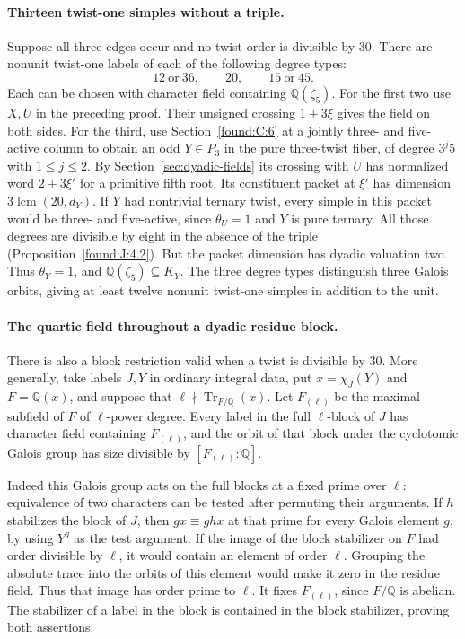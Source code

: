 \documentclass[11pt,a4paper]{article}
\numberwithin{equation}{section}
\theoremstyle{remark}
\newcommand{\QQ}{\mathbb Q}
\newcommand{\lcm}{\operatorname{lcm}}
\begin{document}
\paragraph{Thirteen twist-one simples without a triple.}
Suppose all three edges occur and no twist order is divisible by $30$.
There are nonunit twist-one labels of each of the following degree
types:
\[
       12\ \text{or}\ 36,\qquad 20,\qquad 15\ \text{or}\ 45 .
\]
Each can be chosen with character field containing $\QQ(\zeta_5)$.
For the first two use $X,U$ in the preceding proof. Their unsigned
crossing $1+3\xi$ gives the field on both sides. For the third, use
Section~\ref{found:C:6} at a jointly three- and five-active column to obtain
an odd $Y\in P_3$ in the pure three-twist fiber, of degree $3^j5$
with $1\le j\le2$. By Section~\ref{sec:dyadic-fields} its crossing with $U$ has
normalized word $2+3\xi'$ for a primitive fifth root. Its constituent
packet at $\xi'$ has dimension $3\lcm(20,d_Y)$. If $Y$ had
nontrivial ternary twist, every simple in this packet would be
three- and five-active, since $\theta_U=1$ and $Y$ is pure ternary.
All those degrees are divisible by eight in the absence of the triple (Proposition~\ref{found:J:4.2}). But the packet dimension has dyadic
valuation two. Thus $\theta_Y=1$, and $\QQ(\zeta_5)\subseteq K_Y$.
The three degree types distinguish three Galois orbits, giving
at least twelve nonunit twist-one simples in addition to the unit.

\paragraph{The quartic field throughout a dyadic residue block.}
There is also a block restriction valid when a twist is divisible
by $30$. More generally, take labels $J,Y$ in ordinary integral data,
put $x=\chi_J(Y)$ and $F=\QQ(x)$, and suppose that
$\ell\nmid\operatorname{Tr}_{F/\QQ}(x)$. Let $F_{(\ell)}$ be the
maximal subfield of $F$ of $\ell$-power degree. Every label in the
full $\ell$-block of $J$ has character field containing $F_{(\ell)}$,
and the orbit of that block under the cyclotomic Galois group has
size divisible by $[F_{(\ell)}:\QQ]$.

Indeed this Galois group acts on the full blocks at a fixed prime over
$\ell$: equivalence of two characters can be tested after permuting
their arguments. If $h$ stabilizes the block of $J$, then
$gx\equiv ghx$ at that prime for every Galois element $g$,
by using $Y^g$ as the test argument. If the image of the block
stabilizer on $F$ had order divisible by $\ell$, it would contain
an element of order $\ell$. Grouping the absolute trace into the
orbits of this element would make it zero in the residue field.
Thus that image has order prime to $\ell$. It fixes $F_{(\ell)}$,
since $F/\QQ$ is abelian. The stabilizer of a label in the block is
contained in the block stabilizer, proving both assertions.
\end{document}
